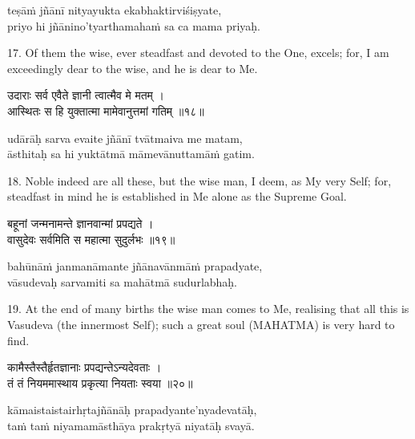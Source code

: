 \begin{transliteration}
teṣāṁ jñānī nityayukta ekabhaktirviśiṣyate, \\
priyo hi jñānino'tyarthamahaṁ sa ca mama priyaḥ.
\end{transliteration}

17. Of them the wise, ever steadfast and devoted to the One, excels; for, I am
exceedingly dear to the wise, and he is dear to Me.

\begin{gitaverse}
उदाराः सर्व एवैते ज्ञानी त्वात्मैव मे मतम् । \\
आस्थितः स हि युक्तात्मा मामेवानुत्तमां गतिम् ॥१८॥
\end{gitaverse}

\begin{transliteration}
udārāḥ sarva evaite jñānī tvātmaiva me matam, \\
āsthitaḥ sa hi yuktātmā māmevānuttamāṁ gatim.
\end{transliteration}

18. Noble indeed are all these, but the wise man, I deem, as My very Self; for,
steadfast in mind he is established in Me alone as the Supreme Goal.

\begin{gitaverse}
बहूनां जन्मनामन्ते ज्ञानवान्मां प्रपद्यते । \\
वासुदेवः सर्वमिति स महात्मा सुदुर्लभः ॥१९॥
\end{gitaverse}

\begin{transliteration}
bahūnāṁ janmanāmante jñānavānmāṁ prapadyate, \\
vāsudevaḥ sarvamiti sa mahātmā sudurlabhaḥ.
\end{transliteration}

19. At the end of many births the wise man comes to Me, realising that all this
is Vasudeva (the innermost Self); such a great soul (MAHATMA) is very hard to
find.

\begin{gitaverse}
कामैस्तैस्तैर्हृतज्ञानाः प्रपद्यन्तेऽन्यदेवताः । \\
तं तं नियममास्थाय प्रकृत्या नियताः स्वया ॥२०॥
\end{gitaverse}

\begin{transliteration}
kāmaistaistairhṛtajñānāḥ prapadyante'nyadevatāḥ, \\
taṁ taṁ niyamamāsthāya prakṛtyā niyatāḥ svayā.
\end{transliteration}


